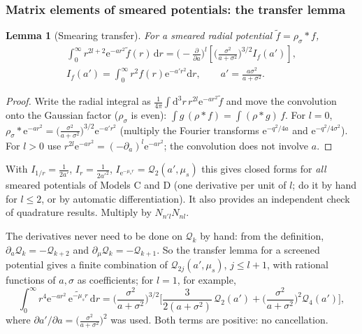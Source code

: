 \documentclass[11pt,a4paper]{article}
\numberwithin{equation}{section}
\theoremstyle{definition}
\theoremstyle{plain}
\newtheorem{lemma}[definition]{Lemma}
\theoremstyle{remark}
\numberwithin{algorithm}{section}
\newcommand{\dd}{\mathrm{d}}
\newcommand{\ee}{\mathrm{e}}
\newcommand{\mus}{\mu_s}
\begin{document}
\subsubsection{Matrix elements of smeared potentials: the transfer lemma}
\begin{lemma}[Smearing transfer]
For a smeared radial potential $\tilde f=\rho_\sigma*f$,
\begin{equation}
\begin{gathered}
\int_0^\infty r^{2l+2}\ee^{-ar^2}\tilde f(r)\,\dd r=\Big(-\frac{\partial}{\partial a}\Big)^{l}\left[\Big(\frac{\sigma^2}{a+\sigma^2}\Big)^{3/2}I_f(a')\right],\\
I_f(a')=\int_0^\infty r^2f(r)\ee^{-a'r^2}\dd r,\qquad a'=\frac{a\sigma^2}{a+\sigma^2}.
\end{gathered}
\label{eq:transfer}
\end{equation}
\end{lemma}
\begin{proof}
Write the radial integral as $\frac1{4\pi}\int\dd^3r\,r^{2l}\ee^{-ar^2}\tilde f$ and move the convolution onto the Gaussian factor ($\rho_\sigma$ is even): $\int g\,(\rho*f)=\int(\rho*g)\,f$. For $l=0$, $\rho_\sigma*\ee^{-ar^2}=\big(\frac{\sigma^2}{a+\sigma^2}\big)^{3/2}\ee^{-a'r^2}$ (multiply the Fourier transforms $\ee^{-q^2/4a}$ and $\ee^{-q^2/4\sigma^2}$). For $l>0$ use $r^{2l}\ee^{-ar^2}=(-\partial_a)^l\ee^{-ar^2}$; the convolution does not involve $a$.
\end{proof}
With $I_{1/r}=\frac1{2a'}$, $I_r=\frac{1}{2a'^2}$, $I_{\ee^{-\mus r}}=\mathcal Q_2(a',\mus)$ this gives closed forms for \emph{all} smeared potentials of Models C and D (one derivative per unit of $l$; do it by hand for $l\le2$, or by automatic differentiation). It also provides an independent check of quadrature results. Multiply by $N_{n'l}N_{nl}$.

The derivatives never need to be done on $\mathcal Q_k$ by hand: from the definition, $\partial_a\mathcal Q_k=-\mathcal Q_{k+2}$ and $\partial_\mu\mathcal Q_k=-\mathcal Q_{k+1}$. So the transfer lemma for a screened potential gives a finite combination of $\mathcal Q_{2j}(a',\mus)$, $j\le l+1$, with rational functions of $a,\sigma$ as coefficients; for $l=1$, for example,
\[
\int_0^\infty r^4\ee^{-ar^2}\,\widetilde{\ee^{-\mus r}}\,\dd r=\Big(\frac{\sigma^2}{a+\sigma^2}\Big)^{3/2}\Big[\frac{3}{2(a+\sigma^2)}\,\mathcal Q_2(a')+\Big(\frac{\sigma^2}{a+\sigma^2}\Big)^2\mathcal Q_4(a')\Big],
\]
where $\partial a'/\partial a=\big(\frac{\sigma^2}{a+\sigma^2}\big)^2$ was used. Both terms are positive: no cancellation.
\end{document}
